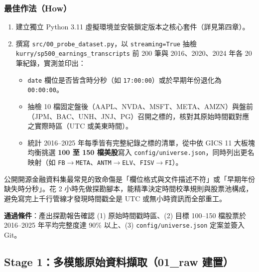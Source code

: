 \documentclass[11pt, a4paper]{article}
\begin{document}
\subsubsection{最佳作法（How）}
\begin{enumerate}[leftmargin=1.5em, itemsep=2pt]
    \item 建立獨立 Python 3.11 虛擬環境並安裝鎖定版本之核心套件（詳見第四章）。
    \item 撰寫 \texttt{src/00\_probe\_dataset.py}，以 \texttt{streaming=True} 抽檢 \texttt{kurry/sp500\_earnings\_transcripts} 前 200 筆與 2016、2020、2024 年各 20 筆紀錄，實測並印出：
    \begin{itemize}[leftmargin=1.2em]
        \item \texttt{date} 欄位是否皆含時分秒（如 \texttt{17:00:00}）或於早期年份退化為 \texttt{00:00:00}。
        \item 抽檢 10 檔固定盤後（AAPL、NVDA、MSFT、META、AMZN）與盤前（JPM、BAC、UNH、JNJ、PG）召開之標的，核對其原始時間戳對應之實際時區（UTC 或美東時間）。
        \item 統計 2016--2025 年每季皆有完整紀錄之標的清單，從中依 GICS 11 大板塊均衡挑選 \textbf{100 至 150 檔美股}寫入 \texttt{config/universe.json}，同時列出更名映射（如 \texttt{FB}$\rightarrow$\texttt{META}、\texttt{ANTM}$\rightarrow$\texttt{ELV}、\texttt{FISV}$\rightarrow$\texttt{FI}）。
    \end{itemize}
\end{enumerate}

\begin{whybox}
公開開源金融資料集最常見的致命傷是「欄位格式與文件描述不符」或「早期年份缺失時分秒」。花 2 小時先做探勘腳本，能精準決定時間校準規則與股票池構成，避免寫完上千行管線才發現時間戳全是 UTC 或無小時資訊而全部重工。
\end{whybox}

\begin{gatebox}
\textbf{通過條件}：產出探勘報告確認 (1) 原始時間戳時區、(2) 目標 100--150 檔股票於 2016--2025 年平均完整度達 90\% 以上、(3) \texttt{config/universe.json} 定案並簽入 Git。
\end{gatebox}

\subsection{Stage 1：多模態原始資料擷取（01\_raw 建置）}
\end{document}

